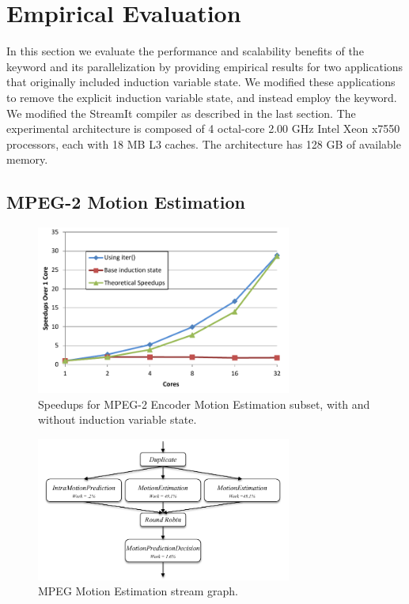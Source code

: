 \section{Empirical Evaluation}
\label{sec:analysis}

In this section we evaluate the performance and scalability benefits
of the \iter keyword and its parallelization by providing empirical
results for two applications that originally included induction
variable state. We modified these applications to remove the explicit
induction variable state, and instead employ the \iter keyword. We
modified the StreamIt compiler as described in the last section.  The
experimental architecture is composed of 4 octal-core 2.00 GHz Intel
Xeon x7550 processors, each with 18 MB L3 caches. The architecture has
128 GB of available memory.

\subsection{MPEG-2 Motion Estimation}
\label{sec:mpeg}


\begin{figure}[t]
\includegraphics[width=3.3in]{figures/mpeg-results.pdf}
\caption{Speedups for MPEG-2 Encoder Motion Estimation subset, with and without induction variable state.  \protect\label{fig:mpeg-results}}
\end{figure}


\begin{figure}[t]
\includegraphics[width=3.3in]{figures/work_estimate_mpeg_motionestimation.pdf}
\caption{MPEG Motion Estimation stream graph.\protect\label{fig:mpegMEgraph}}
\end{figure}


